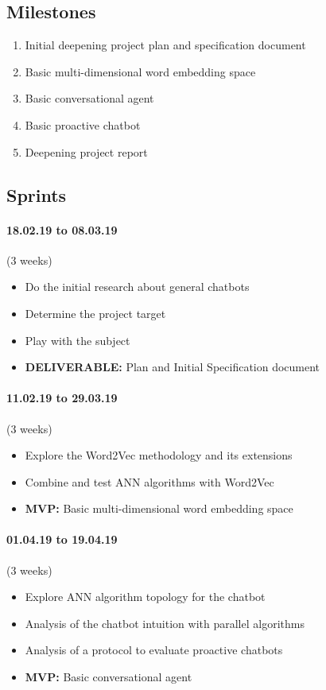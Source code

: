 \subsection{Milestones}
\begin{enumerate}
	\setlength\itemsep{0em}
	\item Initial deepening project plan and specification document
	\item Basic multi-dimensional word embedding space
	\item Basic conversational agent
	\item Basic proactive chatbot
	\item Deepening project report
\end{enumerate}

\subsection{Sprints}

\paragraph{18.02.19 to 08.03.19} (3 weeks) 
\begin{itemize}
	\setlength\itemsep{0em}
	\item Do the initial research about general chatbots
	\item Determine the project target
	\item Play with the subject
	\item \textbf{DELIVERABLE:} Plan and Initial Specification document
\end{itemize}

\paragraph{11.02.19 to 29.03.19} (3 weeks)
\begin{itemize}
	\setlength\itemsep{0em}
	\item Explore the Word2Vec methodology and its extensions
	\item Combine and test ANN algorithms with Word2Vec
	\item \textbf{MVP:} Basic multi-dimensional word embedding space
\end{itemize}

\paragraph{01.04.19 to 19.04.19} (3 weeks)
\begin{itemize}
	\setlength\itemsep{0em}
	\item Explore ANN algorithm topology for the chatbot
	\item Analysis of the chatbot intuition with parallel algorithms
	\item Analysis of a protocol to evaluate proactive chatbots
	\item \textbf{MVP:} Basic conversational agent
\end{itemize}

